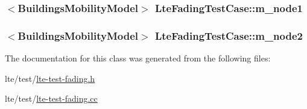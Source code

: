 \subsubsection[{\texorpdfstring{m\+\_\+node1}{m_node1}}]{$<$Buildings\+Mobility\+Model$>$ Lte\+Fading\+Test\+Case\+::m\+\_\+node1\hspace{0.3cm}{\ttfamily [private]}}\hypertarget{classLteFadingTestCase_a88394c0e0a628f556322e2f7347a9ced}{}\label{classLteFadingTestCase_a88394c0e0a628f556322e2f7347a9ced}
\subsubsection[{\texorpdfstring{m\+\_\+node2}{m_node2}}]{$<$Buildings\+Mobility\+Model$>$ Lte\+Fading\+Test\+Case\+::m\+\_\+node2\hspace{0.3cm}{\ttfamily [private]}}\hypertarget{classLteFadingTestCase_a96f66fad68494e4d82ceb56c7f883d78}{}\label{classLteFadingTestCase_a96f66fad68494e4d82ceb56c7f883d78}


The documentation for this class was generated from the following files\+:\begin{DoxyCompactItemize}
\item 
lte/test/\hyperlink{lte-test-fading_8h}{lte-\/test-\/fading.\+h}\item 
lte/test/\hyperlink{lte-test-fading_8cc}{lte-\/test-\/fading.\+cc}\end{DoxyCompactItemize}
